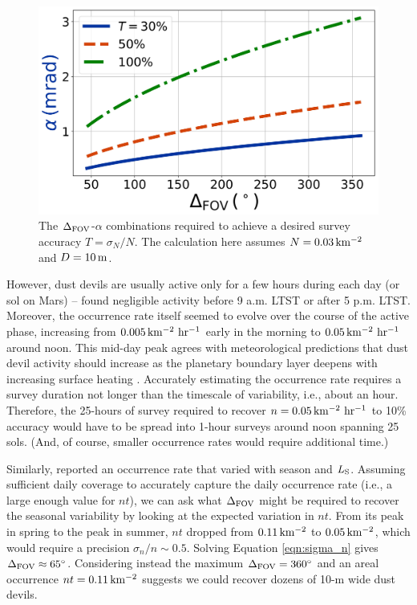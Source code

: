 \documentclass{aastex63}
\begin{document}
\begin{figure}
    \centering
    \includegraphics[width=\textwidth]{figures/alpha_vs_Delta.jpg}
    \caption{The $\Delta_{\rm FOV}$-$\alpha$ combinations required to achieve a desired survey accuracy $T = \sigma_N/N$. The calculation here assumes $N = 0.03\,{\rm km^{-2}}$ and $D = 10\,{\rm m}$.}
    \label{fig:alpha_vs_Delta}
\end{figure}

However, dust devils are usually active only for a few hours during each day (or sol on Mars) -- \citet{2006JGRE..11112S09G} found negligible activity before 9 a.m. LTST or after 5 p.m. LTST. Moreover, the occurrence rate itself seemed to evolve over the course of the active phase, increasing from $0.005\,{\rm km^{-2}\ hr^{-1}}$ early in the morning to  $0.05\,{\rm km^{-2}\ hr^{-1}}$ around noon. This mid-day peak agrees with meteorological predictions that dust devil activity should increase as the planetary boundary layer deepens with increasing surface heating \citep{doi:10.1029/2010RG000351}. Accurately estimating the occurrence rate requires a survey duration not longer than the timescale of variability, i.e., about an hour. Therefore, the 25-hours of survey required to recover $n = 0.05\,{\rm km^{-2}\ hr^{-1}}$ to 10\% accuracy would have to be spread into 1-hour surveys around noon spanning 25 sols. (And, of course, smaller occurrence rates would require additional time.) 

Similarly, \citet{2006JGRE..11112S09G} reported an occurrence rate that varied with season and $L_{\rm S}$. Assuming sufficient daily coverage to accurately capture the daily occurrence rate (i.e., a large enough value for $n t$), we can ask what $\Delta_{\rm FOV}$ might be required to recover the seasonal variability by looking at the expected variation in $n t$. From its peak in spring to the peak in summer, $n t$ dropped from $0.11\,{\rm km^{-2}}$ to $0.05\,{\rm km^{-2}}$, which would require a precision $\sigma_n/n \sim 0.5$. Solving Equation \ref{eqn:sigma_n} gives $\Delta_{\rm FOV} \approx 65^\circ$. Considering instead the maximum $\Delta_{\rm FOV} = 360^\circ$ and an areal occurrence $nt = 0.11\,{\rm km^{-2}}$ suggests we could recover dozens of 10-m wide dust devils. 
\end{document}
